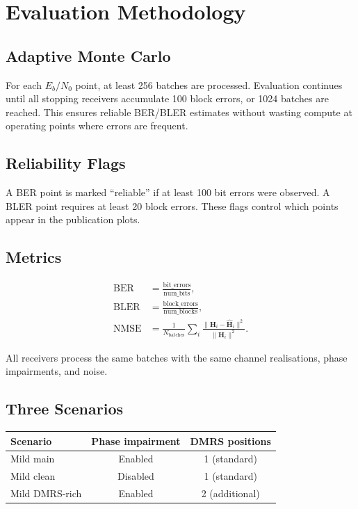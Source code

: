 \documentclass[11pt,a4paper]{article}
\newcommand{\EbNo}{\ensuremath{E_b/N_0}}
\newcommand{\bH}{\mathbf{H}}
\begin{document}
	\section{Evaluation Methodology}
	
	\subsection{Adaptive Monte Carlo}
	
	For each \EbNo{} point, at least 256 batches are processed.  Evaluation continues until all stopping receivers accumulate 100 block errors, or 1024 batches are reached.  This ensures reliable BER/BLER estimates without wasting compute at operating points where errors are frequent.
	
	\subsection{Reliability Flags}
	
	A BER point is marked ``reliable'' if at least 100 bit errors were observed.  A BLER point requires at least 20 block errors.  These flags control which points appear in the publication plots.
	
	\subsection{Metrics}
	
	\begin{align}
		\text{BER} &= \frac{\text{bit\_errors}}{\text{num\_bits}}, \\
		\text{BLER} &= \frac{\text{block\_errors}}{\text{num\_blocks}}, \\
		\text{NMSE} &= \frac{1}{N_{\mathrm{batches}}} \sum_i \frac{\|\bH_i - \widehat{\bH}_i\|^2}{\|\bH_i\|^2}.
	\end{align}
	
	All receivers process the same batches with the same channel realisations, phase impairments, and noise.
	
	\subsection{Three Scenarios}
	
	\begin{center}
		\begin{tabular}{lcc}
			\toprule
			Scenario & Phase impairment & DMRS positions \\
			\midrule
			Mild main & Enabled & 1 (standard) \\
			Mild clean & Disabled & 1 (standard) \\
			Mild DMRS-rich & Enabled & 2 (additional) \\
			\bottomrule
		\end{tabular}
	\end{center}
	
\end{document}

